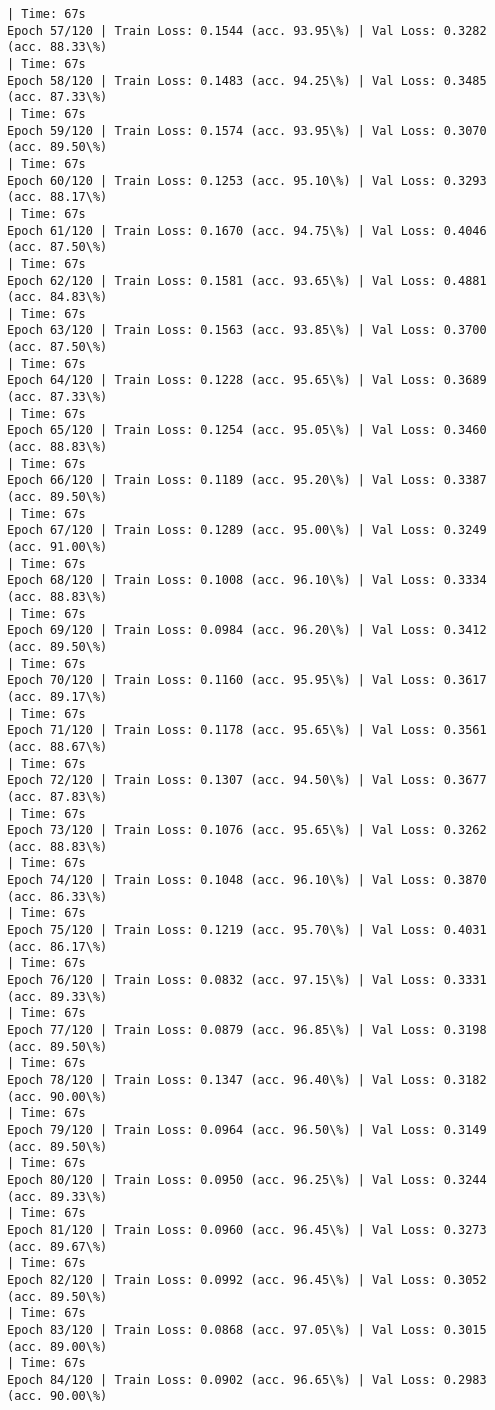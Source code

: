 \documentclass[8pt]{extarticle}
\begin{document}
\begin{Verbatim}[commandchars=\\\{\}]
| Time: 67s
Epoch 57/120 | Train Loss: 0.1544 (acc. 93.95\%) | Val Loss: 0.3282 (acc. 88.33\%)
| Time: 67s
Epoch 58/120 | Train Loss: 0.1483 (acc. 94.25\%) | Val Loss: 0.3485 (acc. 87.33\%)
| Time: 67s
Epoch 59/120 | Train Loss: 0.1574 (acc. 93.95\%) | Val Loss: 0.3070 (acc. 89.50\%)
| Time: 67s
Epoch 60/120 | Train Loss: 0.1253 (acc. 95.10\%) | Val Loss: 0.3293 (acc. 88.17\%)
| Time: 67s
Epoch 61/120 | Train Loss: 0.1670 (acc. 94.75\%) | Val Loss: 0.4046 (acc. 87.50\%)
| Time: 67s
Epoch 62/120 | Train Loss: 0.1581 (acc. 93.65\%) | Val Loss: 0.4881 (acc. 84.83\%)
| Time: 67s
Epoch 63/120 | Train Loss: 0.1563 (acc. 93.85\%) | Val Loss: 0.3700 (acc. 87.50\%)
| Time: 67s
Epoch 64/120 | Train Loss: 0.1228 (acc. 95.65\%) | Val Loss: 0.3689 (acc. 87.33\%)
| Time: 67s
Epoch 65/120 | Train Loss: 0.1254 (acc. 95.05\%) | Val Loss: 0.3460 (acc. 88.83\%)
| Time: 67s
Epoch 66/120 | Train Loss: 0.1189 (acc. 95.20\%) | Val Loss: 0.3387 (acc. 89.50\%)
| Time: 67s
Epoch 67/120 | Train Loss: 0.1289 (acc. 95.00\%) | Val Loss: 0.3249 (acc. 91.00\%)
| Time: 67s
Epoch 68/120 | Train Loss: 0.1008 (acc. 96.10\%) | Val Loss: 0.3334 (acc. 88.83\%)
| Time: 67s
Epoch 69/120 | Train Loss: 0.0984 (acc. 96.20\%) | Val Loss: 0.3412 (acc. 89.50\%)
| Time: 67s
Epoch 70/120 | Train Loss: 0.1160 (acc. 95.95\%) | Val Loss: 0.3617 (acc. 89.17\%)
| Time: 67s
Epoch 71/120 | Train Loss: 0.1178 (acc. 95.65\%) | Val Loss: 0.3561 (acc. 88.67\%)
| Time: 67s
Epoch 72/120 | Train Loss: 0.1307 (acc. 94.50\%) | Val Loss: 0.3677 (acc. 87.83\%)
| Time: 67s
Epoch 73/120 | Train Loss: 0.1076 (acc. 95.65\%) | Val Loss: 0.3262 (acc. 88.83\%)
| Time: 67s
Epoch 74/120 | Train Loss: 0.1048 (acc. 96.10\%) | Val Loss: 0.3870 (acc. 86.33\%)
| Time: 67s
Epoch 75/120 | Train Loss: 0.1219 (acc. 95.70\%) | Val Loss: 0.4031 (acc. 86.17\%)
| Time: 67s
Epoch 76/120 | Train Loss: 0.0832 (acc. 97.15\%) | Val Loss: 0.3331 (acc. 89.33\%)
| Time: 67s
Epoch 77/120 | Train Loss: 0.0879 (acc. 96.85\%) | Val Loss: 0.3198 (acc. 89.50\%)
| Time: 67s
Epoch 78/120 | Train Loss: 0.1347 (acc. 96.40\%) | Val Loss: 0.3182 (acc. 90.00\%)
| Time: 67s
Epoch 79/120 | Train Loss: 0.0964 (acc. 96.50\%) | Val Loss: 0.3149 (acc. 89.50\%)
| Time: 67s
Epoch 80/120 | Train Loss: 0.0950 (acc. 96.25\%) | Val Loss: 0.3244 (acc. 89.33\%)
| Time: 67s
Epoch 81/120 | Train Loss: 0.0960 (acc. 96.45\%) | Val Loss: 0.3273 (acc. 89.67\%)
| Time: 67s
Epoch 82/120 | Train Loss: 0.0992 (acc. 96.45\%) | Val Loss: 0.3052 (acc. 89.50\%)
| Time: 67s
Epoch 83/120 | Train Loss: 0.0868 (acc. 97.05\%) | Val Loss: 0.3015 (acc. 89.00\%)
| Time: 67s
Epoch 84/120 | Train Loss: 0.0902 (acc. 96.65\%) | Val Loss: 0.2983 (acc. 90.00\%)

\end{Verbatim}
\end{document}
